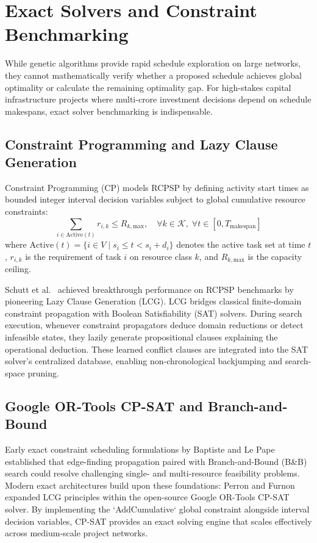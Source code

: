 \documentclass[conference]{IEEEtran}
\begin{document}
\section{Exact Solvers and Constraint Benchmarking}

While genetic algorithms provide rapid schedule exploration on large networks, they cannot mathematically verify whether a proposed schedule achieves global optimality or calculate the remaining optimality gap. For high-stakes capital infrastructure projects where multi-crore investment decisions depend on schedule makespans, exact solver benchmarking is indispensable.

\subsection{Constraint Programming and Lazy Clause Generation}
Constraint Programming (CP) models RCPSP by defining activity start times as bounded integer interval decision variables subject to global cumulative resource constraints:
\begin{equation}
\sum_{i \in \text{Active}(t)} r_{i, k} \le R_{k, \text{max}}, \quad \forall k \in \mathcal{K}, \; \forall t \in [0, T_{\text{makespan}}]
\end{equation}
where $\text{Active}(t) = \{i \in V \mid s_i \le t < s_i + d_i\}$ denotes the active task set at time $t$, $r_{i, k}$ is the requirement of task $i$ on resource class $k$, and $R_{k, \text{max}}$ is the capacity ceiling.

Schutt et al.~\cite{schutt2013solving} achieved breakthrough performance on RCPSP benchmarks by pioneering Lazy Clause Generation (LCG). LCG bridges classical finite-domain constraint propagation with Boolean Satisfiability (SAT) solvers. During search execution, whenever constraint propagators deduce domain reductions or detect infeasible states, they lazily generate propositional clauses explaining the operational deduction. These learned conflict clauses are integrated into the SAT solver's centralized database, enabling non-chronological backjumping and search-space pruning.

\subsection{Google OR-Tools CP-SAT and Branch-and-Bound}
Early exact constraint scheduling formulations by Baptiste and Le Pape~\cite{baptiste1996branch} established that edge-finding propagation paired with Branch-and-Bound (B\&B) search could resolve challenging single- and multi-resource feasibility problems. Modern exact architectures build upon these foundations: Perron and Furnon~\cite{perron2020ortools} expanded LCG principles within the open-source Google OR-Tools CP-SAT solver. By implementing the `AddCumulative` global constraint alongside interval decision variables, CP-SAT provides an exact solving engine that scales effectively across medium-scale project networks.
\end{document}
